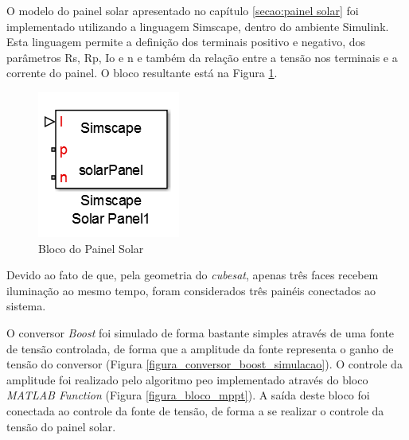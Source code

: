 O modelo do painel solar apresentado no capítulo \ref{secao:painel solar} foi implementado utilizando a linguagem Simscape, dentro do ambiente Simulink. Esta linguagem permite a definição dos terminais positivo e negativo, dos parâmetros \gls{Rs}, \gls{Rp}, \gls{Io} e \gls{n} e também da relação entre a tensão nos terminais e a corrente do painel. O bloco resultante está na Figura \ref{figura_bloco_painel_solar}.

\begin{figure}[!htpb]
\begin{center}
\includegraphics[scale=0.5]{figures/solarPanelBlock.png}
\end{center}
\caption{Bloco do Painel Solar}
\label{figura_bloco_painel_solar}
\end{figure}

Devido ao fato de que, pela geometria do \textit{cubesat}, apenas três faces recebem iluminação ao mesmo tempo, foram considerados três painéis conectados ao sistema.

O conversor \textit{Boost} foi simulado de forma bastante simples através de uma fonte de tensão controlada, de forma que a amplitude da fonte representa o ganho de tensão do conversor (Figura \ref{figura_conversor_boost_simulacao}). O controle da amplitude foi realizado pelo algoritmo \gls{peo} implementado através do bloco \textit{MATLAB Function} (Figura \ref{figura_bloco_mppt}). A saída deste bloco foi conectada ao controle da fonte de tensão, de forma a se realizar o controle da tensão do painel solar.

